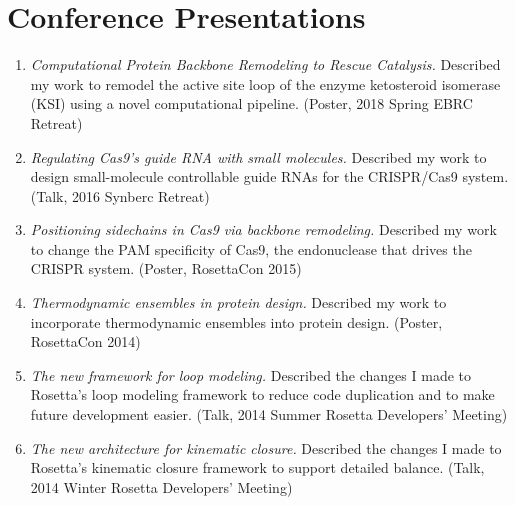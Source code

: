 \section{Conference Presentations}

\begin{enumerate}

\item \emph{Computational Protein Backbone Remodeling to Rescue Catalysis.} 
        Described my work to remodel the active site loop of the enzyme 
        ketosteroid isomerase (KSI) using a novel computational pipeline.  
        (Poster, 2018 Spring EBRC Retreat)

\item \emph{Regulating Cas9's guide RNA with small molecules.}
        Described my work to design small-molecule controllable guide RNAs for 
        the CRISPR/Cas9 system.  (Talk, 2016 Synberc Retreat)

\item \emph{Positioning sidechains in Cas9 via backbone remodeling.}
        Described my work to change the PAM specificity of Cas9, the 
        endonuclease that drives the CRISPR system.  (Poster, RosettaCon 2015)

\item \emph{Thermodynamic ensembles in protein design.}
        Described my work to incorporate thermodynamic ensembles into protein 
        design.  (Poster, RosettaCon 2014)

\item \emph{The new framework for loop modeling.}
        Described the changes I made to Rosetta's loop modeling framework to 
        reduce code duplication and to make future development easier.  (Talk, 
        2014 Summer Rosetta Developers' Meeting)

\item \emph{The new architecture for kinematic closure.} 
        Described the changes I made to Rosetta's kinematic closure framework 
        to support detailed balance.  (Talk, 2014 Winter Rosetta Developers' 
        Meeting)

\end{enumerate}


